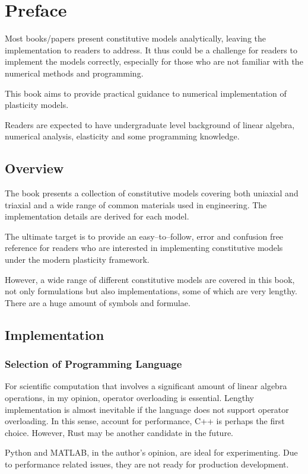 \chapter{Preface}
Most books/papers present constitutive models analytically, leaving the implementation to readers to address.
It thus could be a challenge for readers to implement the models correctly, especially for those who are not familiar with the numerical methods and programming.

This book aims to provide practical guidance to numerical implementation of plasticity models.

Readers are expected to have undergraduate level background of linear algebra, numerical analysis, elasticity and some programming knowledge.
\section{Overview}
The book presents a collection of constitutive models covering both uniaxial and triaxial and a wide range of common materials used in engineering. The implementation details are derived for each model.

The ultimate target is to provide an easy--to--follow, error and confusion free reference for readers who are interested in implementing constitutive models under the modern plasticity framework.

However, a wide range of different constitutive models are covered in this book, not only formulations but also implementations, some of which are very lengthy. There are a huge amount of symbols and formulae.
\section{Implementation}
\subsection{Selection of Programming Language}
For scientific computation that involves a significant amount of linear algebra operations, in my opinion, operator overloading is essential. Lengthy implementation is almost inevitable if the language does not support operator overloading. In this sense, account for performance, C++ is perhaps the first choice. However, Rust may be another candidate in the future.

Python and MATLAB, in the author's opinion, are ideal for experimenting. Due to performance related issues, they are not ready for production development.


